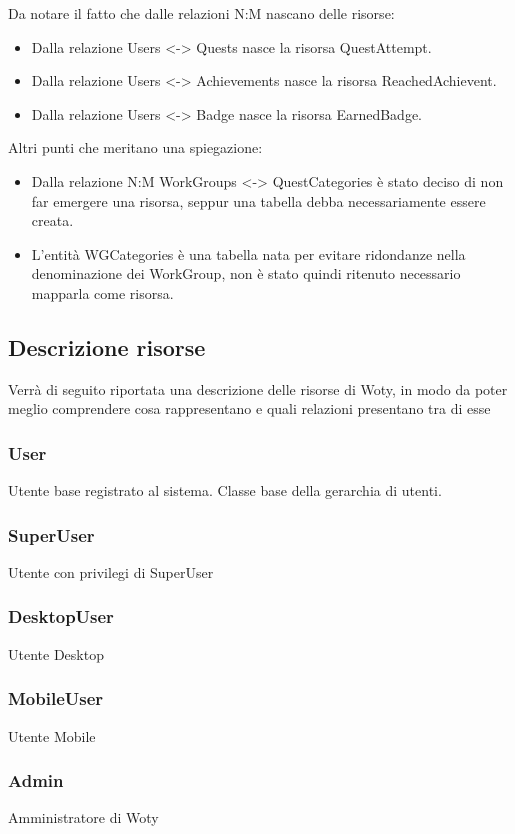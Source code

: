 Da notare il fatto che dalle relazioni N:M nascano delle risorse:

\begin{itemize}
	\item Dalla relazione Users <-> Quests nasce la risorsa QuestAttempt.
	\item Dalla relazione Users <-> Achievements nasce la risorsa ReachedAchievent.
	\item Dalla relazione Users <-> Badge nasce la risorsa EarnedBadge.
\end{itemize}

Altri punti che meritano una spiegazione:

\begin{itemize}
	\item Dalla relazione N:M WorkGroups <-> QuestCategories è stato deciso di non far emergere una risorsa, seppur una tabella debba necessariamente essere creata.
	\item L'entità WGCategories è una tabella nata per evitare ridondanze nella denominazione dei WorkGroup, non è stato quindi ritenuto necessario mapparla come risorsa.
\end{itemize}

\subsection{Descrizione risorse}
Verrà di seguito riportata una descrizione delle risorse di Woty, in modo da poter meglio comprendere cosa rappresentano e quali relazioni presentano tra di esse

\subsubsection{User} Utente base registrato al sistema. Classe base della gerarchia di utenti.
\subsubsection{SuperUser} Utente con privilegi di SuperUser
\subsubsection{DesktopUser} Utente Desktop
\subsubsection{MobileUser} Utente Mobile
\subsubsection{Admin} Amministratore di Woty
